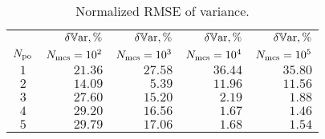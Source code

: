 \begin{table}
  \centering
  \caption{Normalized RMSE of variance.}
  \vspace{-10pt}
  \begin{tabular}{crrrr}
    \toprule
    {} & $\delta\mathbb{V}\text{ar}, \%$ & $\delta\mathbb{V}\text{ar}, \%$ & $\delta\mathbb{V}\text{ar}, \%$ & $\delta\mathbb{V}\text{ar}, \%$ \\
    ${N_\text{po}}$ & $N_\text{mcs} = 10^2$ & $N_\text{mcs} = 10^3$ & $N_\text{mcs} = 10^4$ & $N_\text{mcs} = 10^5$ \\
    \midrule
    $1$ & $21.36$ & $27.58$ & $36.44$ & $35.80$ \\
    $2$ & $14.09$ & $ 5.39$ & $11.96$ & $11.56$ \\
    $3$ & $27.60$ & $15.20$ & $ 2.19$ & $ 1.88$ \\
    $4$ & $29.20$ & $16.56$ & $ 1.67$ & $ 1.46$ \\
    $5$ & $29.79$ & $17.06$ & $ 1.68$ & $ 1.54$ \\
    \bottomrule
  \end{tabular}
  \vspace{-10pt}
\end{table}
